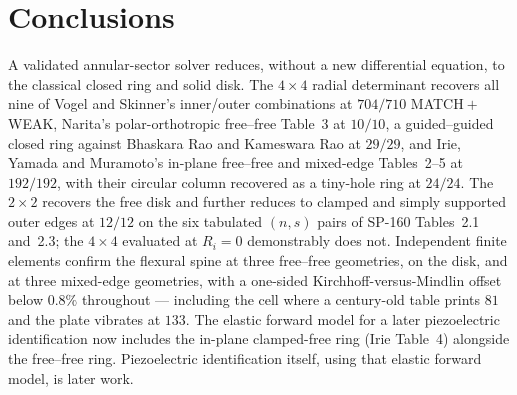 \documentclass[11pt]{article}
\begin{document}
\section{Conclusions}\label{sec:conclusions}
A validated annular-sector solver reduces, without a new differential
equation, to the classical closed ring and solid disk. The $4\times4$ radial
determinant recovers all nine of Vogel and Skinner's inner/outer combinations
at $704/710$ MATCH${}+{}$WEAK, Narita's polar-orthotropic free--free
Table~3 at $10/10$, a guided--guided closed ring against Bhaskara Rao and
Kameswara Rao at $29/29$, and Irie, Yamada and Muramoto's in-plane
free--free and mixed-edge Tables~2--5 at $192/192$, with their circular
column recovered as a tiny-hole ring at $24/24$. The $2\times2$ recovers
the free disk and further reduces to clamped and simply supported outer
edges at $12/12$ on the six tabulated $(n,s)$ pairs of SP-160
Tables~2.1 and~2.3; the $4\times4$ evaluated at $R_i=0$ demonstrably does
not.
Independent finite elements confirm the flexural spine at three free--free
geometries, on the disk, and at three mixed-edge geometries, with a
one-sided Kirchhoff-versus-Mindlin offset below $0.8\%$ throughout ---
including the cell where a century-old table prints $81$ and the plate
vibrates at $133$. The elastic forward model for a later piezoelectric
identification now includes the in-plane clamped-free ring (Irie Table~4)
alongside the free--free ring. Piezoelectric identification itself, using
that elastic forward model, is later work.

\small
\end{document}
